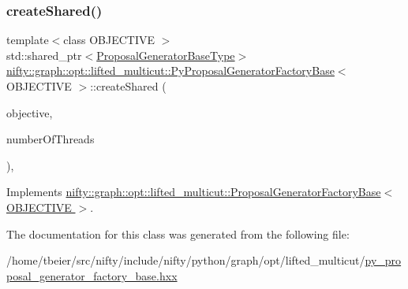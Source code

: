 \subsubsection{\texorpdfstring{create\+Shared()}{createShared()}}
{\footnotesize\ttfamily template$<$class O\+B\+J\+E\+C\+T\+I\+VE $>$ \\
std\+::shared\+\_\+ptr$<$\hyperlink{classnifty_1_1graph_1_1opt_1_1lifted__multicut_1_1ProposalGeneratorFactoryBase_ab201fe6397370621b50977e67ae55ace}{Proposal\+Generator\+Base\+Type}$>$ \hyperlink{classnifty_1_1graph_1_1opt_1_1lifted__multicut_1_1PyProposalGeneratorFactoryBase}{nifty\+::graph\+::opt\+::lifted\+\_\+multicut\+::\+Py\+Proposal\+Generator\+Factory\+Base}$<$ O\+B\+J\+E\+C\+T\+I\+VE $>$\+::create\+Shared (\begin{DoxyParamCaption}\item[{const \hyperlink{classnifty_1_1graph_1_1opt_1_1lifted__multicut_1_1ProposalGeneratorFactoryBase_a1986f0a3868e76ba5613f49ca4fc7dc6}{Objective\+Type} \&}]{objective,  }\item[{const size\+\_\+t}]{number\+Of\+Threads }\end{DoxyParamCaption})\hspace{0.3cm}{\ttfamily [inline]}, {\ttfamily [virtual]}}



Implements \hyperlink{classnifty_1_1graph_1_1opt_1_1lifted__multicut_1_1ProposalGeneratorFactoryBase_a8e4754d1fcb3bf3df9f6543daa88d50b}{nifty\+::graph\+::opt\+::lifted\+\_\+multicut\+::\+Proposal\+Generator\+Factory\+Base$<$ O\+B\+J\+E\+C\+T\+I\+V\+E $>$}.



The documentation for this class was generated from the following file\+:\begin{DoxyCompactItemize}
\item 
/home/tbeier/src/nifty/include/nifty/python/graph/opt/lifted\+\_\+multicut/\hyperlink{lifted__multicut_2py__proposal__generator__factory__base_8hxx}{py\+\_\+proposal\+\_\+generator\+\_\+factory\+\_\+base.\+hxx}\end{DoxyCompactItemize}
